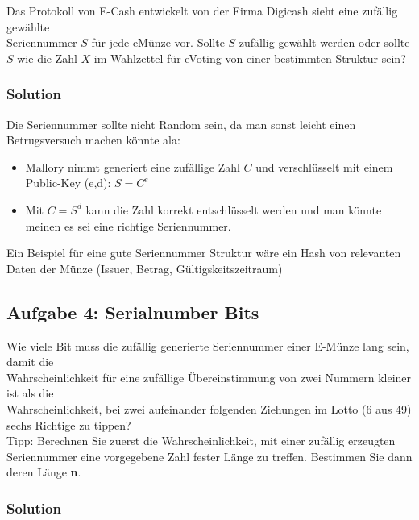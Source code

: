 \documentclass[11pt]{article}
\begin{document}
Das Protokoll von E-Cash entwickelt von der Firma Digicash sieht eine
zufällig gewählte\\
Seriennummer \(S\) für jede eMünze vor. Sollte \(S\) zufällig gewählt
werden oder sollte \(S\) wie die Zahl \(X\) im
Wahlzettel für eVoting von einer bestimmten Struktur sein?

\hypertarget{solution}{%
\subsubsection{Solution}\label{solution}}

Die Seriennummer sollte nicht Random sein, da man sonst leicht einen
Betrugsversuch machen könnte ala:

\begin{itemize}
\item
  Mallory nimmt generiert eine zufällige Zahl \(C\) und verschlüsselt
  mit einem Public-Key (e,d): \(S=C^{e}\)
\item
  Mit \(C = S^{d}\) kann die Zahl korrekt entschlüsselt werden und
  man könnte meinen es sei eine richtige Seriennummer.
\end{itemize}

Ein Beispiel für eine gute Seriennummer Struktur wäre ein Hash von
relevanten Daten der Münze (Issuer, Betrag, Gültigskeitszeitraum)

    \hypertarget{aufgabe-4-serialnumber-bits}{%
\subsection{Aufgabe 4: Serialnumber
Bits}\label{aufgabe-4-serialnumber-bits}}

Wie viele Bit muss die zufällig generierte Seriennummer einer E-Münze
lang sein, damit die\\
Wahrscheinlichkeit für eine zufällige Übereinstimmung von zwei Nummern
kleiner ist als die\\
Wahrscheinlichkeit, bei zwei aufeinander folgenden Ziehungen im Lotto (6
aus 49) sechs Richtige zu
tippen? \\
Tipp: Berechnen Sie zuerst die Wahrscheinlichkeit, mit einer
zufällig erzeugten Seriennummer 
eine vorgegebene Zahl fester Länge zu treffen. Bestimmen Sie dann deren
Länge \textbf{n}.

\hypertarget{solution}{%
\subsubsection{Solution}\label{solution}}
\end{document}
